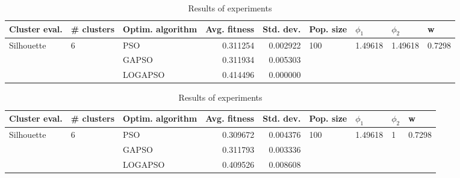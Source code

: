 \documentclass{article}
\begin{document}
\begin{table}
\centering
\caption{Results of experiments}
\begin{tabular}{lllrrllll}
\toprule
              Cluster eval. &        \# clusters & Optim. algorithm &  Avg. fitness &  Std. dev. &            Pop. size &               $\phi_{1}$ &               $\phi_{2}$ &                       w \\
\midrule
\multirow{3}{*}{Silhouette} & \multirow{3}{*}{6} &              PSO &      0.311254 &   0.002922 & \multirow{3}{*}{100} & \multirow{3}{*}{1.49618} & \multirow{3}{*}{1.49618} & \multirow{3}{*}{0.7298} \\
                            &                    &            GAPSO &      0.311934 &   0.005303 &                      &                          &                          &                         \\
                            &                    &          LOGAPSO &      0.414496 &   0.000000 &                      &                          &                          &                         \\
\bottomrule
\end{tabular}
\end{table}
\begin{table}
\centering
\caption{Results of experiments}
\begin{tabular}{lllrrllll}
\toprule
              Cluster eval. &        \# clusters & Optim. algorithm &  Avg. fitness &  Std. dev. &            Pop. size &               $\phi_{1}$ &         $\phi_{2}$ &                       w \\
\midrule
\multirow{3}{*}{Silhouette} & \multirow{3}{*}{6} &              PSO &      0.309672 &   0.004376 & \multirow{3}{*}{100} & \multirow{3}{*}{1.49618} & \multirow{3}{*}{1} & \multirow{3}{*}{0.7298} \\
                            &                    &            GAPSO &      0.311793 &   0.003336 &                      &                          &                    &                         \\
                            &                    &          LOGAPSO &      0.409526 &   0.008608 &                      &                          &                    &                         \\
\bottomrule
\end{tabular}
\end{table}
\end{document}
